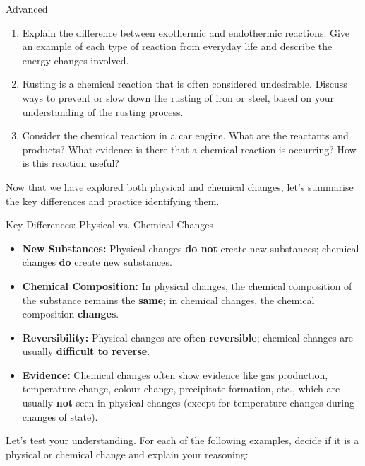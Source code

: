 \begin{tieredquestions}{Advanced}
\begin{enumerate}
    \item  Explain the difference between exothermic and endothermic reactions. Give an example of each type of reaction from everyday life and describe the energy changes involved.
    \item  Rusting is a chemical reaction that is often considered undesirable. Discuss ways to prevent or slow down the rusting of iron or steel, based on your understanding of the rusting process.
    \item  Consider the chemical reaction in a car engine. What are the reactants and products? What evidence is there that a chemical reaction is occurring? How is this reaction useful?
\end{enumerate}
\end{tieredquestions}


\FloatBarrier

Now that we have explored both physical and chemical changes, let's summarise the key differences and practice identifying them.

\begin{keyconcept}{Key Differences: Physical vs. Chemical Changes}
\begin{itemize}
    \item \textbf{New Substances:} Physical changes \textbf{do not} create new substances; chemical changes \textbf{do} create new substances.
    \item \textbf{Chemical Composition:} In physical changes, the chemical composition of the substance remains the \textbf{same}; in chemical changes, the chemical composition \textbf{changes}.
    \item \textbf{Reversibility:} Physical changes are often \textbf{reversible}; chemical changes are usually \textbf{difficult to reverse}.
    \item \textbf{Evidence:} Chemical changes often show evidence like gas production, temperature change, colour change, precipitate formation, etc., which are usually \textbf{not} seen in physical changes (except for temperature changes during changes of state).
\end{itemize}
\end{keyconcept}

Let's test your understanding. For each of the following examples, decide if it is a physical or chemical change and explain your reasoning:

